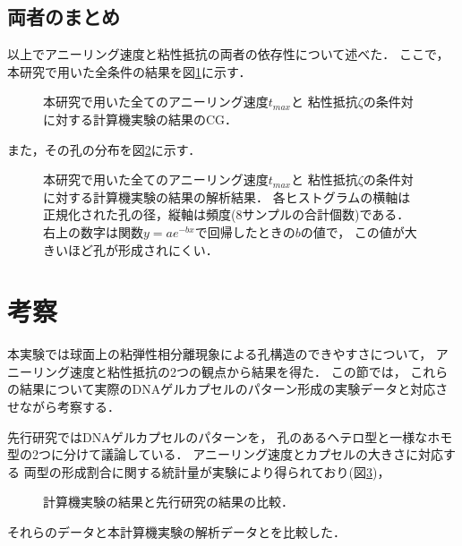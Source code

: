 \subsection{両者のまとめ}
以上でアニーリング速度と粘性抵抗の両者の依存性について述べた．
ここで，本研究で用いた全条件の結果を図\ref{fig:result_sphere_all}に示す．
\begin{figure}
    \centering
    
    \caption{
        本研究で用いた全てのアニーリング速度$t_{max}$と
        粘性抵抗$\zeta$の条件対に対する計算機実験の結果のCG．
    }
\label{fig:result_sphere_all}
\end{figure}
また，その孔の分布を図\ref{fig:result_sphere_all_hist}に示す．
\begin{figure}
    \centering
    
    \caption{
        本研究で用いた全てのアニーリング速度$t_{max}$と
        粘性抵抗$\zeta$の条件対に対する計算機実験の結果の解析結果．
        各ヒストグラムの横軸は正規化された孔の径，縦軸は頻度(8サンプルの合計個数)である．
        右上の数字は関数$y=ae^{-bx}$で回帰したときの$b$の値で，
        この値が大きいほど孔が形成されにくい．
    }
    \label{fig:result_sphere_all_hist}
\end{figure}


\section{考察}
本実験では球面上の粘弾性相分離現象による孔構造のできやすさについて，
アニーリング速度と粘性抵抗の2つの観点から結果を得た．
この節では，
これらの結果について実際のDNAゲルカプセルのパターン形成の実験データと対応させながら考察する．

先行研究ではDNAゲルカプセルのパターンを，
孔のあるヘテロ型と一様なホモ型の2つに分けて議論している．
アニーリング速度とカプセルの大きさに対応する
両型の形成割合に関する統計量が実験により得られており(図\ref{fig:result_moritasan})，
\begin{figure}
    \centering
    
    \caption{
        計算機実験の結果と先行研究の結果の比較．
    }
    \label{fig:result_moritasan}
\end{figure}
それらのデータと本計算機実験の解析データとを比較した．



